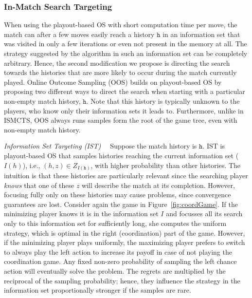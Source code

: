 \documentclass[letterpaper]{article}
\newcommand{\tth}{\mathtt{h}}
\newcounter{vlNoteCounter}
\newcommand{\vlnote}[1]{{\scriptsize \color{blue} $\blacksquare$ \refstepcounter{vlNoteCounter}\textsf{[VL]$_{\arabic{vlNoteCounter}}$:{#1}}}}
\begin{document}
\subsubsection{In-Match Search Targeting}
When using the playout-based OS with short computation time per move, the match can after a few moves easily reach a history $\tth$ in an information set that was visited in only a few iterations or even not present in the memory at all.
The strategy suggested by the algorithm in such an information set can be completely arbitrary.
Hence, the second modification we propose is directing the search towards the histories that are more likely to occur during the match currently played.
Online Outcome Sampling (OOS) builds on playout-based OS by proposing two different ways to direct the search when starting with a particular non-empty match history, $\tth$. Note that this history is typically unknown to the players, who know only their information sets it leads to. Furthermore, unlike in ISMCTS, OOS always runs samples form the root of the game tree, even with non-empty match history.

\textit{Information Set Targeting (IST)~~}
Suppose the match history is $\tth$. IST is playout-based OS that samples histories reaching the current information set ($I(h)$), i.e., $(h,z) \in Z_{I(\tth)}$, with higher probability than other histories.
The intuition is that these histories are particularly 
relevant since the searching player {\it knows} that one of these $z$ will describe the match at its completion. 
However, focusing fully only on these histories may cause problems, since convergence guarantees are lost.
Consider again the game in Figure~\ref{fig:coordGame}. 
If the minimizing player knows it is in the information set $I$ and focusses all its search only to this information set for sufficiently long, she computes the uniform strategy, which is optimal in the right (coordination) part of the game.
However, if the minimizing player plays uniformly, the maximizing player prefers to switch to always play the left action to increase its payoff in case of not playing the coordination game. Any fixed non-zero probability of sampling the left chance action will 
eventually solve the problem. The regrets are multiplied by the reciprocal of the sampling probability; hence, they influence the strategy 
in the information set proportionally stronger if the samples are rare. 

\end{document}
